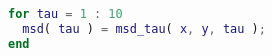 \begin{lstlisting}[language=matlab]
for tau = 1 : 10
  msd( tau ) = msd_tau( x, y, tau );
end

\end{lstlisting}
